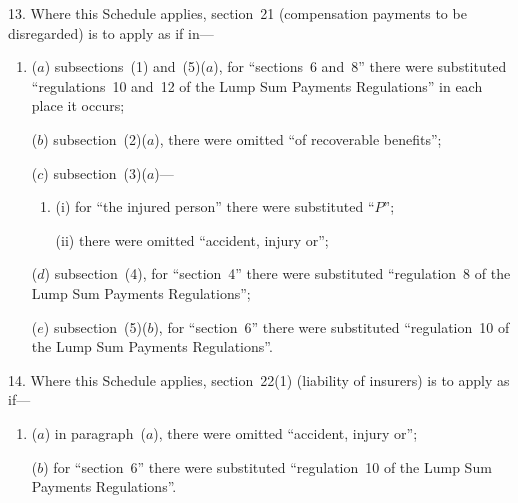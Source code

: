 \documentclass[12pt,a4paper]{article}
\begin{document}
13.  Where this Schedule applies, section~21 (compensation payments to be disregarded) is to apply as if in—
\begin{enumerate}\item[]
($a$) subsections~(1) and~(5)($a$), for “sections~6 and~8” there were substituted “regulations~10 and~12 of the Lump Sum Payments Regulations” in each place it occurs;

($b$) subsection~(2)($a$), there were omitted “of recoverable benefits”;

($c$) subsection~(3)($a$)—
\begin{enumerate}\item[]
(i) for “the injured person” there were substituted “$P$”;

(ii) there were omitted “accident, injury or”;
\end{enumerate}

($d$) subsection~(4), for “section~4” there were substituted “regulation~8 of the Lump Sum Payments Regulations”;

($e$) subsection~(5)($b$), for “section~6” there were substituted “regulation~10 of the Lump Sum Payments Regulations”.
\end{enumerate}

\medskip

14.  Where this Schedule applies, section~22(1) (liability of insurers) is to apply as if—
\begin{enumerate}\item[]
($a$) in paragraph~($a$), there were omitted “accident, injury or”;

($b$) for “section~6” there were substituted “regulation~10 of the Lump Sum Payments Regulations”.
\end{enumerate}

\medskip
\end{document}
